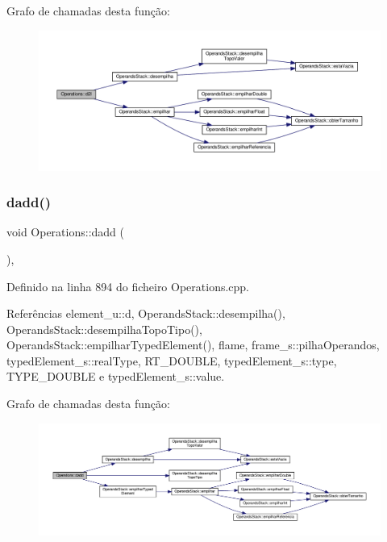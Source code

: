 Grafo de chamadas desta função\+:
\nopagebreak
\begin{figure}[H]
\begin{center}
\leavevmode
\includegraphics[width=350pt]{classOperations_a2babf3c9e2ac30a70a07f8d43b32440a_cgraph}
\end{center}
\end{figure}
\mbox{\label{classOperations_a8a23241bed8c033ab75994a18bf2a702}} 
\subsubsection{\texorpdfstring{dadd()}{dadd()}}
{\footnotesize\ttfamily void Operations\+::dadd (\begin{DoxyParamCaption}{ }\end{DoxyParamCaption})\hspace{0.3cm}{\ttfamily [static]}, {\ttfamily [private]}}



Definido na linha 894 do ficheiro Operations.\+cpp.



Referências element\+\_\+u\+::d, Operands\+Stack\+::desempilha(), Operands\+Stack\+::desempilha\+Topo\+Tipo(), Operands\+Stack\+::empilhar\+Typed\+Element(), flame, frame\+\_\+s\+::pilha\+Operandos, typed\+Element\+\_\+s\+::real\+Type, R\+T\+\_\+\+D\+O\+U\+B\+LE, typed\+Element\+\_\+s\+::type, T\+Y\+P\+E\+\_\+\+D\+O\+U\+B\+LE e typed\+Element\+\_\+s\+::value.

Grafo de chamadas desta função\+:
\nopagebreak
\begin{figure}[H]
\begin{center}
\leavevmode
\includegraphics[width=350pt]{classOperations_a8a23241bed8c033ab75994a18bf2a702_cgraph}
\end{center}
\end{figure}
\mbox{\label{classOperations_a63691de547749780c372e285bd6a97bc}} 
